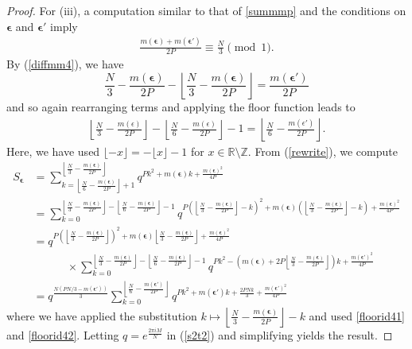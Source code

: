 \documentclass[11pt,reqno]{amsart}
\theoremstyle{definition}
\numberwithin{equation}{section}
\newcommand{\bea}{\begin{equation}\begin{aligned}}
\newcommand{\eea}{\end{aligned}\end{equation}}
\renewcommand{\=}{\;=\;}
\def\qqquad{\qquad\quad}
\newcommand{\Z}{\mathbb{Z}}
\begin{document}
\begin{proof}
For (iii), a computation similar to that of \eqref{summmp} and the conditions on $\bm \epsilon$ and $\bm \epsilon'$ imply
\bea\label{diffmm4}
\frac{m(\bm \epsilon)+m(\bm \epsilon')}{2P} \equiv \frac {N} 3 \pmod 1.
\eea
By (\ref{diffmm4}), we have
\begin{equation} \label{floorid41}
\frac {N} 3 -\frac{m(\bm \epsilon)}{2P}
-\left\lfloor
\frac {N} 3 -\frac{m(\bm \epsilon)}{2P}
\right\rfloor
=
\frac{m(\bm \epsilon')}{2P}
\end{equation}
and so again rearranging terms and applying the floor function leads to
\bea\label{floorid42}
\left\lfloor
\frac {N} 3 -\frac{m(\epsilon)}{2P}
\right\rfloor
-
\left\lfloor
\frac {N} 6 -\frac{m(\epsilon)}{2P}
\right\rfloor-1=
\left\lfloor\frac N 6 -\frac{m(\epsilon')}{2P}\right\rfloor.
\eea
Here, we have used $\lfloor-x\rfloor = -\lfloor x\rfloor -1$ for $x\in\mathbb R\setminus\Z$. From (\ref{rewrite}), we compute
\begin{equation} \label{s2t2}
\begin{aligned}
S_{\bm \epsilon}  &=\sum_{k=\left \lfloor \frac N6-\frac {m(\bm \epsilon)}{2P} \right \rfloor+1}
^{\left \lfloor \frac N3-\frac {m(\bm \epsilon)}{2P} \right \rfloor}
q^{P k^2+m(\bm \epsilon)k +\frac{m(\bm \epsilon)^2}{4P}}\\
&=\sum_{k=0}^{\left\lfloor\frac N 3 - \frac{m(\bm \epsilon)}{2P} \right\rfloor-\left\lfloor\frac N 6 - \frac{m(\bm \epsilon)}{2P}\right\rfloor-1}
q^{P \left ( \left \lfloor \frac{N}{3} - \frac{m(\bm \epsilon)}{2P} \right \rfloor - k \right )^2 + m(\bm \epsilon) \left( \left \lfloor \frac N3 -\frac{m(\bm \epsilon)}{2P} \right \rfloor- k \right) + \frac{m(\bm \epsilon)^2}{4P}}  \\
&=q^{P \left( \left \lfloor \frac{N}3-\frac{m(\bm \epsilon)}{2P} \right \rfloor \right )^2 + m(\bm \epsilon) \left \lfloor \frac N3-\frac{m(\bm \epsilon)}{2P}\right \rfloor  + \frac{m(\bm \epsilon)^2}{4P}} \\
&\qqquad\times\sum_{k=0}^{\left\lfloor\frac N 3 - \frac{m(\bm \epsilon)}{2P} \right\rfloor
-\left\lfloor\frac N 6 - \frac{m(\bm \epsilon)}{2P} \right\rfloor-1}
q^{P k^2- \left ( m(\bm \epsilon) + 2P \left \lfloor \frac N3-\frac{m(\bm \epsilon)}{2P}\right \rfloor \right) k +\frac{m(\bm \epsilon')^2}{4P}}\\
&= q^{\frac{N \left ( PN/3 - m(\bm \epsilon') \right)}{3}}
\sum_{k=0}^{\left \lfloor \frac N 6  - \frac{m(\bm \epsilon')}{2P} \right \rfloor}
q^{P k^2 + m(\bm \epsilon') k + \frac{2PNk}{3} + \frac{m(\bm \epsilon')^2}{4P}}
\end{aligned}
\end{equation}
where we have applied the substitution $k \mapsto \left \lfloor \frac{N}3-\frac{m(\bm \epsilon)}{2P} \right \rfloor-k$ and used \eqref{floorid41} and \eqref{floorid42}. Letting $q=e^{\frac{2\pi i M}{N}}$ in (\ref{s2t2}) and simplifying yields the result.


\end{proof}
\end{document}
